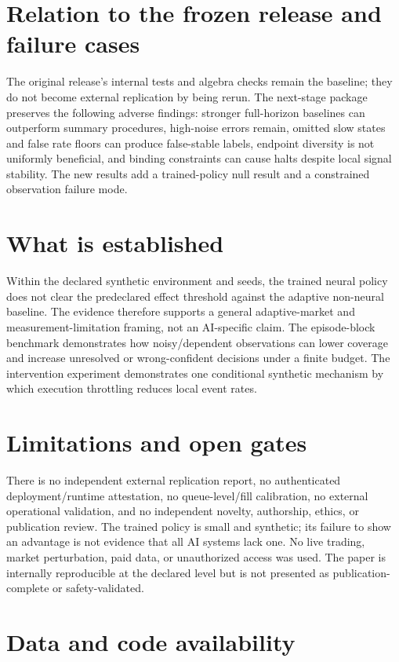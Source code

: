 \documentclass[10pt]{article}
\begin{document}
\section{Relation to the frozen release and failure cases}

The original release's internal tests and algebra checks remain the baseline;
they do not become external replication by being rerun. The next-stage package
preserves the following adverse findings: stronger full-horizon baselines can
outperform summary procedures, high-noise errors remain, omitted slow states
and false rate floors can produce false-stable labels, endpoint diversity is
not uniformly beneficial, and binding constraints can cause halts despite
local signal stability. The new results add a trained-policy null result and a
constrained observation failure mode.

\section{What is established}

Within the declared synthetic environment and seeds, the trained neural policy
does not clear the predeclared effect threshold against the adaptive
non-neural baseline. The evidence therefore supports a general adaptive-market
and measurement-limitation framing, not an AI-specific claim. The episode-block
benchmark demonstrates how noisy/dependent observations can lower coverage and
increase unresolved or wrong-confident decisions under a finite budget. The
intervention experiment demonstrates one conditional synthetic mechanism by
which execution throttling reduces local event rates.

\section{Limitations and open gates}

There is no independent external replication report, no authenticated
deployment/runtime attestation, no queue-level/fill calibration, no external
operational validation, and no independent novelty, authorship, ethics, or
publication review. The trained policy is small and synthetic; its
failure to show an advantage is not evidence that all AI systems lack one.
No live trading, market perturbation, paid data, or unauthorized access was
used. The paper is internally reproducible at the declared level but is not
presented as publication-complete or safety-validated.

\section{Data and code availability}
\end{document}
